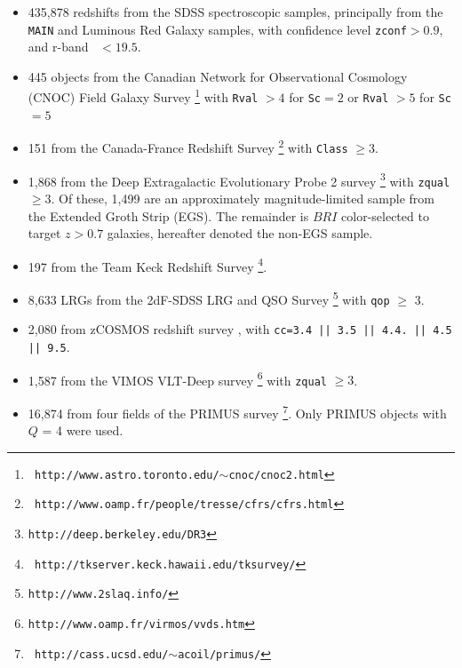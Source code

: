 \documentclass[12pt,preprint]{aastex}
\begin{document}
\begin{itemize} 

    \item 435,878 redshifts from the SDSS spectroscopic samples, principally
    from the \texttt{MAIN} \citep{Strauss02} and Luminous Red Galaxy
    \citep[\texttt{LRG};][]{Eisenstein01} samples, with confidence level
    \texttt{zconf}$ > 0.9$, and r-band \cmodelmag\ $ <19.5$.


    \item 445 objects from the Canadian Network for Observational Cosmology
    (CNOC) Field Galaxy Survey \cite[CNOC2;][]{yee00}\footnote{\tt
    http://www.astro.toronto.edu/$\sim$cnoc/cnoc2.html} with \texttt{Rval} $>4$
    for \texttt{Sc}$=2$ or \texttt{Rval} $> 5$ for \texttt{Sc}$=5$

    \item 151 from the Canada-France Redshift Survey
    \cite[CFRS;][]{lilly95}\footnote{\tt
    http://www.oamp.fr/people/tresse/cfrs/cfrs.html} with \texttt{Class} $\geq
    3$.

    \item 1,868 from the Deep Extragalactic Evolutionary Probe 2 survey
    \citep[DEEP2;][]{weiner05}\footnote{\tt http://deep.berkeley.edu/DR3} with
    \texttt{zqual} $\geq 3$.  Of these, 1,499 are an approximately
    magnitude-limited sample from the Extended Groth Strip (EGS).  The
    remainder is $BRI$ color-selected to target $z>0.7$ galaxies, hereafter
    denoted the non-EGS sample. 

    \item 197 from the Team Keck Redshift Survey
    \cite[TKRS;][]{wirth04}\footnote{\tt
    http://tkserver.keck.hawaii.edu/tksurvey/}.

    \item 8,633 LRGs from the 2dF-SDSS LRG and QSO Survey
    \cite[2SLAQ;][]{cannon06}\footnote{\tt http://www.2slaq.info/} with
    \texttt{qop} $\geq$ 3.

    \item  2,080 from zCOSMOS redshift survey \cite{lilly07}, with
    \texttt{cc=3.4 || 3.5 || 4.4.  || 4.5 || 9.5}.
    
    \item 1,587 from the VIMOS VLT-Deep survey
    \cite[VVDS;][]{garilli08}\footnote{\tt http://www.oamp.fr/virmos/vvds.htm}
    with \texttt{zqual} $\geq 3$.

    \item 16,874 from four fields of the PRIMUS survey
    \cite[PRIMUS;][]{coil10,cool12}\footnote{\tt
    http://cass.ucsd.edu/$\sim$acoil/primus/}.  Only PRIMUS objects with $Q$ =
    4 were used.      \end{itemize}
\end{document}
